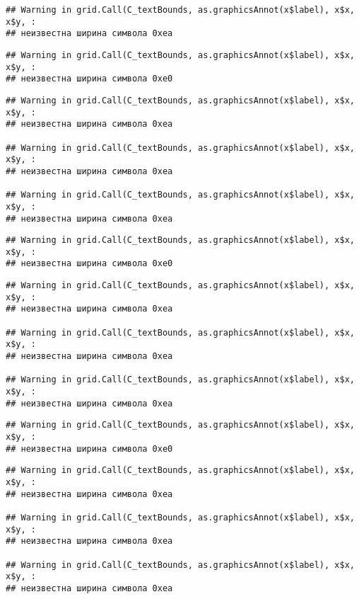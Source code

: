 \documentclass[
]{article}
\begin{document}
\begin{verbatim}
## Warning in grid.Call(C_textBounds, as.graphicsAnnot(x$label), x$x, x$y, :
## неизвестна ширина символа 0xea
\end{verbatim}

\begin{verbatim}
## Warning in grid.Call(C_textBounds, as.graphicsAnnot(x$label), x$x, x$y, :
## неизвестна ширина символа 0xe0
\end{verbatim}

\begin{verbatim}
## Warning in grid.Call(C_textBounds, as.graphicsAnnot(x$label), x$x, x$y, :
## неизвестна ширина символа 0xea

## Warning in grid.Call(C_textBounds, as.graphicsAnnot(x$label), x$x, x$y, :
## неизвестна ширина символа 0xea

## Warning in grid.Call(C_textBounds, as.graphicsAnnot(x$label), x$x, x$y, :
## неизвестна ширина символа 0xea
\end{verbatim}

\begin{verbatim}
## Warning in grid.Call(C_textBounds, as.graphicsAnnot(x$label), x$x, x$y, :
## неизвестна ширина символа 0xe0
\end{verbatim}

\begin{verbatim}
## Warning in grid.Call(C_textBounds, as.graphicsAnnot(x$label), x$x, x$y, :
## неизвестна ширина символа 0xea

## Warning in grid.Call(C_textBounds, as.graphicsAnnot(x$label), x$x, x$y, :
## неизвестна ширина символа 0xea

## Warning in grid.Call(C_textBounds, as.graphicsAnnot(x$label), x$x, x$y, :
## неизвестна ширина символа 0xea
\end{verbatim}

\begin{verbatim}
## Warning in grid.Call(C_textBounds, as.graphicsAnnot(x$label), x$x, x$y, :
## неизвестна ширина символа 0xe0
\end{verbatim}

\begin{verbatim}
## Warning in grid.Call(C_textBounds, as.graphicsAnnot(x$label), x$x, x$y, :
## неизвестна ширина символа 0xea

## Warning in grid.Call(C_textBounds, as.graphicsAnnot(x$label), x$x, x$y, :
## неизвестна ширина символа 0xea

## Warning in grid.Call(C_textBounds, as.graphicsAnnot(x$label), x$x, x$y, :
## неизвестна ширина символа 0xea
\end{verbatim}
\end{document}
